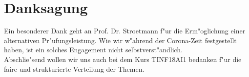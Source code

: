 \chapter*{Danksagung}

Ein besonderer Dank geht an Prof. Dr. Stroetmann f"ur die Erm"oglichung einer alternativen Pr"ufungsleistung. Wie wir w"ahrend der Corona-Zeit festgestellt haben, ist ein solches Engagement nicht selbstverst"andlich.\\
Abschlie"send wollen wir uns auch bei dem Kurs TINF18AI1 bedanken f"ur die faire und strukturierte Verteilung der Themen.


